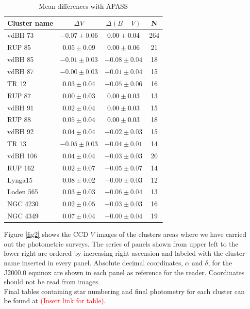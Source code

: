 \documentclass[draft]{aa}
\begin{document}
\begin{table}[ht]
    \centering
    \begin{tabular}{lccc}
    \hline
    Cluster name & $\Delta V$ & $\Delta (B-V)$ & N \\
    \hline \hline
    vdBH 73 & $-0.07\pm0.06$ & $0.00\pm0.04$ & 264\\
    RUP 85 & $0.05\pm0.09$ & $0.00\pm0.06$ & 21\\
    vdBH 85 & $-0.01\pm0.03$ & $-0.08\pm0.04$ & 18\\
    vdBH 87 & $-0.00\pm0.03$ & $-0.01\pm0.04$ & 15\\
    TR 12 & $0.03\pm0.04$ & $-0.05\pm0.06$ & 16\\
    RUP 87 & $0.00\pm0.03$ & $0.00\pm0.03$ & 13\\
    vdBH 91 & $0.02\pm0.04$ & $0.00\pm0.03$ & 15\\
    RUP 88 & $0.05\pm0.04$ & $0.00\pm0.03$ & 18\\
    vdBH 92 & $0.04\pm0.04$ & $-0.02\pm0.03$ & 15\\
    TR 13 & $-0.05\pm0.03$ & $-0.04\pm0.01$ & 14\\
    vdBH 106 & $0.04\pm0.04$ & $-0.03\pm0.03$ & 20\\
    RUP 162 & $0.02\pm0.07$ & $-0.05\pm0.07$ & 14\\
    Lynga15 & $0.08\pm0.02$ & $-0.00\pm0.03$ & 12\\
    Loden 565 & $0.03\pm0.03$ & $-0.06\pm0.04$ & 13\\
    NGC 4230 & $0.02\pm0.05$ & $-0.03\pm0.03$ & 16\\
    NGC 4349 & $0.07\pm0.04$ & $-0.00\pm0.04$ & 19\\
    \hline
    \end{tabular}
    \caption{Mean differences with APASS}
    \label{tab:apass_diffs}
\end{table}

Figure \ref{fig2} shows the CCD $V$ images of the clusters areas where we have
carried out the photometric surveys. The series of panels shown from upper left
to the lower right are ordered by increasing right ascension and labeled with
the cluster name inserted in every panel. Absolute decimal
coordinates, $\alpha$ and $\delta$, for the J2000.0 equinox are shown in each
panel as reference for the reader. Coordinates should not be read from images.\\

Final tables containing star numbering and final photometry for each cluster can
be found at \textcolor{red}{(Insert link for table)}.
\end{document}
